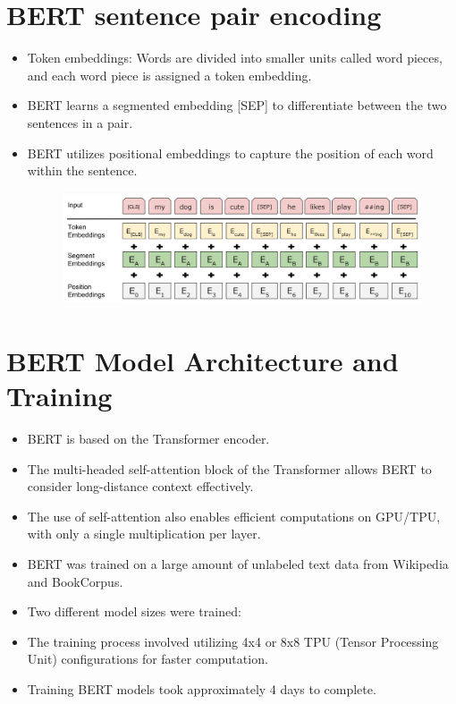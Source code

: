 \section{BERT sentence pair encoding}
\begin{itemize}
\item Token embeddings: Words are divided into smaller units called word pieces, and each word piece is assigned a token embedding.
\item BERT learns a segmented embedding [SEP] to differentiate between the two sentences in a pair.
\item BERT utilizes positional embeddings to capture the position of each word within the sentence.

 \begin{figure}[h]
        	\includegraphics[scale = 0.18]{pics/BSPE.png}
        \end{figure}  



\end{itemize}


\section{BERT Model Architecture and Training}
\begin{itemize}
\item BERT is based on the Transformer encoder.
\item The multi-headed self-attention block of the Transformer  allows BERT to consider long-distance context effectively.
\item The use of self-attention also enables efficient computations on GPU/TPU, with only a single multiplication per layer.
\item BERT was trained on a large amount of unlabeled text data from Wikipedia and BookCorpus.
\item Two different model sizes were trained:
\item The training process involved utilizing 4x4 or 8x8 TPU (Tensor Processing Unit) configurations for faster computation.
\item Training BERT models took approximately 4 days to complete.
\end{itemize}


